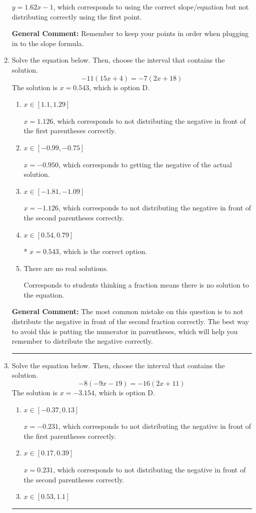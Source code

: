 \documentclass{extbook}[14pt]
\newcommand{\litem}[1]{\item #1

\rule{\textwidth}{0.4pt}}
\begin{document}
\begin{enumerate}
{\begin{enumerate}[label=\Alph*.]
 $y = 1.62x -1$, which corresponds to using the correct slope/equation but not distributing correctly using the first point.
\end{enumerate}

\textbf{General Comment:} Remember to keep your points in order when plugging in to the slope formula.
}
\litem{
Solve the equation below. Then, choose the interval that contains the solution.
\[ -11(15x + 4) = -7(2x + 18) \]The solution is \( x = 0.543 \), which is option D.\begin{enumerate}[label=\Alph*.]
\item \( x \in [1.1, 1.29] \)

$x = 1.126$, which corresponds to not distributing the negative in front of the first parentheses correctly.
\item \( x \in [-0.99, -0.75] \)

$x = -0.950$, which corresponds to getting the negative of the actual solution.
\item \( x \in [-1.81, -1.09] \)

$x = -1.126$, which corresponds to not distributing the negative in front of the second parentheses correctly.
\item \( x \in [0.54, 0.79] \)

* $x = 0.543$, which is the correct option.
\item \( \text{There are no real solutions.} \)

Corresponds to students thinking a fraction means there is no solution to the equation.
\end{enumerate}

\textbf{General Comment:} The most common mistake on this question is to not distribute the negative in front of the second fraction correctly. The best way to avoid this is putting the numerator in parentheses, which will help you remember to distribute the negative correctly.
}
\litem{
Solve the equation below. Then, choose the interval that contains the solution.
\[ -8(-9x -19) = -16(2x + 11) \]The solution is \( x = -3.154 \), which is option D.\begin{enumerate}[label=\Alph*.]
\item \( x \in [-0.37, 0.13] \)

$x = -0.231$, which corresponds to not distributing the negative in front of the first parentheses correctly.
\item \( x \in [0.17, 0.39] \)

$x = 0.231$, which corresponds to not distributing the negative in front of the second parentheses correctly.
\item \( x \in [0.53, 1.1] \)


\end{enumerate}}
\end{enumerate}
\end{document}
